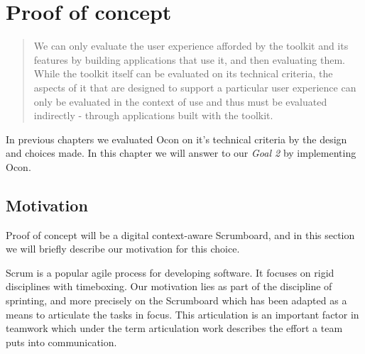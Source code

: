 \documentclass[../report.tex]{subfiles}
\begin{document}
\graphicspath{{img/}{../img/}}


\chapter{Proof of concept}

\blockquote{
We can only evaluate the user experience afforded by the toolkit and its features by building applications that use it, and then evaluating them. While the toolkit itself can be evaluated on its technical criteria, the aspects of it that are designed to support a particular user experience can only be evaluated in the context of use and thus must be evaluated indirectly - through applications built with the toolkit. \cite{Infrastructure (2003)} \\}

In previous chapters we evaluated Ocon on it's technical criteria by the design and choices made. In this chapter we will answer to our \textit{Goal 2} by implementing Ocon.

\section{Motivation}

Proof of concept will be a digital context-aware Scrumboard, and in this section we will briefly describe our motivation for this choice.





Scrum is a popular agile process for developing software. It focuses on rigid disciplines with timeboxing. Our motivation lies as part of the discipline of sprinting, and more precisely on the Scrumboard which has been adapted as a means to articulate the tasks in focus. This articulation is an important factor in teamwork which under the term articulation work describes the effort a team puts into communication.
\end{document}

